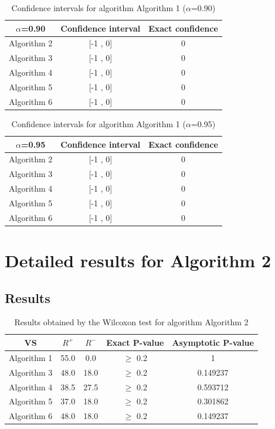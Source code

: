 \documentclass[a4paper,10pt]{article}
\begin{document}
\begin{table}[!htp]
\centering\small
\begin{tabular}{
|c|c|c|}
\hline
 $\alpha$=0.90 & Confidence interval & Exact confidence \\ \hline 
Algorithm 2 & [-1 , 0] & 0\\ \hline 
Algorithm 3 & [-1 , 0] & 0\\ \hline 
Algorithm 4 & [-1 , 0] & 0\\ \hline 
Algorithm 5 & [-1 , 0] & 0\\ \hline 
Algorithm 6 & [-1 , 0] & 0\\ \hline 

\end{tabular}
\caption{Confidence intervals for algorithm Algorithm 1 ($\alpha$=0.90)}
\end{table}
\begin{table}[!htp]
\centering\small
\begin{tabular}{
|c|c|c|}
\hline
 $\alpha$=0.95 & Confidence interval & Exact confidence \\ \hline 
Algorithm 2 & [-1 , 0] & 0\\ \hline 
Algorithm 3 & [-1 , 0] & 0\\ \hline 
Algorithm 4 & [-1 , 0] & 0\\ \hline 
Algorithm 5 & [-1 , 0] & 0\\ \hline 
Algorithm 6 & [-1 , 0] & 0\\ \hline 

\end{tabular}
\caption{Confidence intervals for algorithm Algorithm 1 ($\alpha$=0.95)}
\end{table}

 \clearpage 


\section{Detailed results for Algorithm 2}


\subsection{Results}

\begin{table}[!htp]
\centering\small
\begin{tabular}{
|c|c|c|c|c|}
\hline
 VS & $R^{+}$ & $R^{-}$ & Exact P-value & Asymptotic P-value \\ \hline 
Algorithm 1 & 55.0 & 0.0 & $\geq$ 0.2 & 1\\ \hline 
Algorithm 3 & 48.0 & 18.0 & $\geq$ 0.2 & 0.149237\\ \hline 
Algorithm 4 & 38.5 & 27.5 & $\geq$ 0.2 & 0.593712\\ \hline 
Algorithm 5 & 37.0 & 18.0 & $\geq$ 0.2 & 0.301862\\ \hline 
Algorithm 6 & 48.0 & 18.0 & $\geq$ 0.2 & 0.149237\\ \hline 

\end{tabular}
\caption{Results obtained by the Wilcoxon test for algorithm Algorithm 2}
\end{table}
\end{document}
